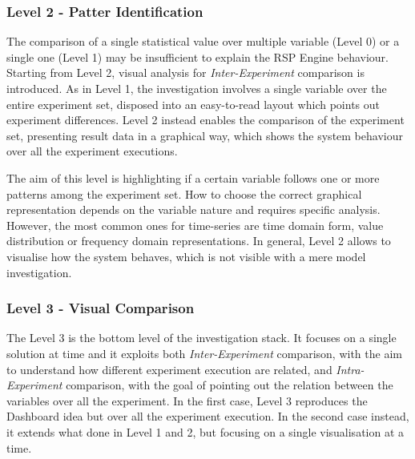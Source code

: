 \subsubsection{Level 2 - Patter Identification}\label{sec:heaven-level2}

The comparison of a single statistical value over multiple variable (Level 0) or a single one (Level 1) may be insufficient to explain the RSP Engine behaviour. Starting from Level 2, visual analysis for \textit{Inter-Experiment} comparison is introduced. As in Level 1, the investigation involves a single variable over the entire experiment set, disposed into an easy-to-read layout which points out experiment differences. Level 2 instead enables the comparison of the experiment set, presenting result data in a graphical way, which shows the system behaviour over all the experiment executions.

The aim of this level is highlighting if a certain variable follows one or more patterns among the experiment set. How to choose the correct graphical representation depends on the variable nature and requires specific analysis. However, the most common ones for time-series are time domain form, value distribution or frequency domain representations. In general, Level 2 allows to visualise how the system behaves, which is not visible with a mere model investigation.

\subsubsection{Level 3 - Visual Comparison}\label{sec:heaven-level3}

The Level 3 is the bottom level of the investigation stack. It focuses on a single solution at time and it exploits both \textit{Inter-Experiment} comparison, with the aim to understand how different experiment execution are related, and \textit{Intra-Experiment} comparison, with the goal of pointing out the relation between the variables over all the experiment. In the first case, Level 3 reproduces the Dashboard idea but over all the experiment execution. In the second case instead, it extends what done in Level 1 and 2, but focusing on a single visualisation at a time.

